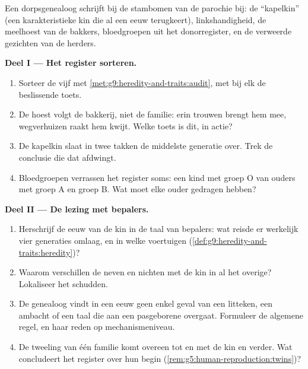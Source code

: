 \begin{problem}\label{pb:g9:heredity-and-traits:1}
Een dorpsgenealoog schrijft bij de stambomen van de parochie
 bij: de ``kapelkin'' (een karakteristieke kin die al
een eeuw terugkeert), linkshandigheid, de meelhoest van de
bakkers, bloedgroepen uit het donorregister, en de verweerde
gezichten van de herders.

\medskip\noindent\textbf{Deel I --- Het register
sorteren.}
\begin{enumerate}
  \item Sorteer de vijf  met
        \cref{met:g9:heredity-and-traits:audit}, met bij elk
        de beslissende toets.
  \item De hoest volgt de bakkerij, niet de familie: erin
        trouwen brengt hem mee, wegverhuizen raakt hem kwijt.
        Welke toets is dit, in actie?
  \item De kapelkin slaat in twee takken de middelste
        generatie over. Trek de conclusie die dat afdwingt.
  \item Bloedgroepen verrassen het register soms: een kind met
        groep O van ouders met groep A en groep B. Wat moet
        elke ouder gedragen hebben?
\end{enumerate}

\medskip\noindent\textbf{Deel II --- De lezing met
bepalers.}
\begin{enumerate}[resume]
  \item Herschrijf de eeuw van de kin in de taal van bepalers:
        wat reisde er werkelijk vier generaties omlaag, en in
        welke voertuigen
        (\cref{def:g9:heredity-and-traits:heredity})?
  \item Waarom verschillen de neven en nichten met de kin in
        al het overige? Lokaliseer het schudden.
  \item De genealoog vindt in een eeuw geen enkel geval van
        een litteken, een ambacht of een taal die aan een
        pasgeborene overgaat. Formuleer de algemene regel, en
        haar reden op mechanismeniveau.
  \item De tweeling van één familie komt overeen tot en met de
        kin en verder. Wat concludeert het register over hun
        begin
        (\cref{rem:g5:human-reproduction:twins})?
\end{enumerate}


\end{problem}
